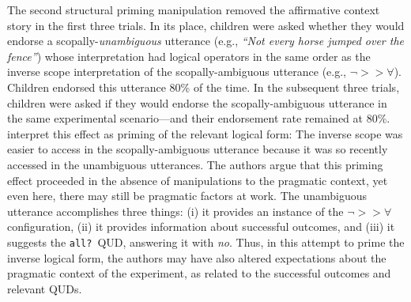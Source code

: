 \documentclass[10pt,a4paper]{article}
\begin{document}

The second structural priming manipulation removed the affirmative context story in the first three trials. 
In its place, children were asked whether they would endorse a scopally-\textit{unambiguous} utterance (e.g., \textit{``Not every horse jumped over the fence''}) whose interpretation had logical operators in the same order as the inverse scope interpretation of the scopally-ambiguous utterance (e.g., $\neg>>\forall$).
Children endorsed this utterance 80\% of the time.
In the subsequent three trials, children were asked if they would endorse the scopally-ambiguous utterance in the same experimental scenario---and their endorsement rate remained at 80\%. 
 interpret this effect as priming of the relevant logical form: The inverse scope was easier to access in the scopally-ambiguous utterance because it was so recently accessed in the unambiguous utterances. The authors argue that this priming effect proceeded in the absence of manipulations to the pragmatic context, 
yet even here, there may still be pragmatic factors at work. 
The unambiguous utterance accomplishes three things: (i) it provides an instance of the $\neg>>\forall$ configuration, (ii) it provides information about successful outcomes, and (iii) it suggests the \texttt{all?}~QUD, answering it with \emph{no}. 
Thus, in this attempt to prime the inverse logical form, the authors may have also altered expectations about the pragmatic context of the experiment, as related to the successful outcomes and relevant QUDs.
\end{document}
